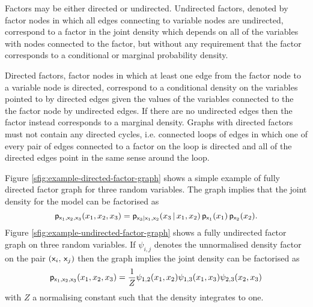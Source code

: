 Factors may be either directed or undirected. Undirected factors, denoted by factor nodes in which all edges connecting to variable nodes are undirected, correspond to a factor in the joint density which depends on all of the variables with nodes connected to the factor, but without any requirement that the factor corresponds to a conditional or marginal probability density. 

Directed factors, factor nodes in which at least one edge from the factor node to a variable node is directed, correspond to a conditional density on the variables pointed to by directed edges given the values of the variables connected to the the factor node by undirected edges. If there are no undirected edges then the factor instead corresponds to a marginal density. Graphs with directed factors must not contain any directed cycles, i.e. connected loops of edges in which one of every pair of edges connected to a factor on the loop is directed and all of the directed edges point in the same sense around the loop. 

Figure \ref{sfig:example-directed-factor-graph} shows a simple example of fully directed factor graph for three random variables. The graph implies that the joint density for the model can be factorised as
\begin{equation}\label{eq:example-directed-graphical-model-factorisation}
  \mathsf{p}_{\mathsf{x}_1,\mathsf{x}_2,\mathsf{x}_3}(x_1,x_2,x_3) = 
  \mathsf{p}_{\mathsf{x}_3|\mathsf{x}_1,\mathsf{x}_2}(x_3 \operatorname{|} x_1,x_2) \,
  \mathsf{p}_{\mathsf{x}_1}(x_1) \, \mathsf{p}_{\mathsf{x}_2}(x_2).
\end{equation}
Figure \ref{sfig:example-undirected-factor-graph} shows a fully undirected factor graph on three random variables. If $\psi_{i,j}$ denotes the unnormalised density factor on the pair $(\mathsf{x}_i,\,\mathsf{x}_j)$ then the graph implies the joint density can be factorised as
\begin{equation}\label{eq:example-undirected-factor-graph-factorisation}
\begin{split}
  \mathsf{p}_{\mathsf{x}_1,\mathsf{x}_2,\mathsf{x}_3}(x_1,x_2,x_3) =
  \frac{1}{Z} 
  \psi_{1,2}(x_1,x_2)
  \psi_{1,3}(x_1,x_3)
  \psi_{2,3}(x_2,x_3)
\end{split}
\end{equation}
with $Z$ a normalising constant such that the density integrates to one.

